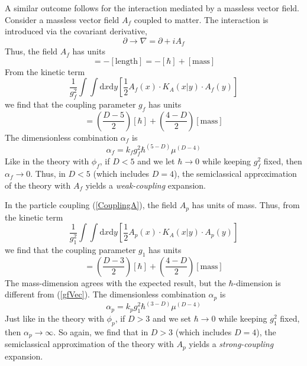 A similar outcome follows for the interaction mediated by a massless vector field. Consider a massless vector field $A_{f}$ coupled to matter. The interaction is introduced via the covariant derivative,
\begin{equation}
	\partial \longrightarrow \nabla = \partial + iA_{f}
\end{equation}
Thus, the field $A_{f}$ has units
\begin{equation}
	[A_{f}] = - [\text{length}] = - [\hbar] + [\text{mass}]
\end{equation}
From the kinetic term
\begin{equation}
	\frac{1}{g^{2}_{f}} \int \int \mathrm{d}x \mathrm{d}y \left[ \frac{1}{2} A_{f}(x) \cdot K_{A}(x|y) \cdot A_{f}(y)  \right]
\end{equation}
we find that the coupling parameter $g_{f}$ has units
\begin{equation}
	[g_{f}] = \left( \frac{D - 5}{2} \right) [\hbar] + \left( \frac{4 - D}{2} \right) [\text{mass}] \label{gfVec}
\end{equation}
The dimensionless combination $\alpha_{f}$ is
\begin{equation}
	\alpha_{f} = k_{f} g_{f}^{2} \hbar^{(5 - D)} \mu^{(D - 4)}
\end{equation}
Like in the theory with $\phi_{f}$, if $D < 5$ and we let $\hbar \rightarrow 0$ while keeping $g_{f}^{2}$ fixed, then $\alpha_{f} \rightarrow 0$. Thus, in $D < 5$ (which includes $D = 4$), the semiclassical approximation of the theory with $A_{f}$ yields a \textit{weak-coupling} expansion.

In the particle coupling (\ref{CouplingA}), the field $A_{p}$ has units of mass. Thus, from the kinetic term
\begin{equation}
	\frac{1}{g^{2}_{1}} \int \int \mathrm{d}x \mathrm{d}y \left[ \frac{1}{2} A_{p}(x) \cdot K_{A}(x|y) \cdot A_{p}(y)  \right]
\end{equation}
we find that the coupling parameter $g_{1}$ has units
\begin{equation}
	[g_{1}] = \left( \frac{D - 3}{2} \right) [\hbar] + \left( \frac{4 - D}{2} \right) [\text{mass}]
\end{equation}
The mass-dimension agrees with the expected result, but the $\hbar$-dimension is different from (\ref{gfVec}). The dimensionless combination $\alpha_{p}$ is
\begin{equation}
	\alpha_{p} = k_{p} g_{1}^{2} \hbar^{(3 - D)} \mu^{(D - 4)}
\end{equation}
Just like in the theory with $\phi_{p}$, if $D > 3$ and we set $\hbar \rightarrow 0$ while keeping $g_{1}^{2}$ fixed, then $\alpha_{p} \rightarrow \infty$. So again, we find that in $D > 3$ (which includes $D = 4$), the semiclassical approximation of the theory with $A_{p}$ yields a \textit{strong-coupling} expansion.

